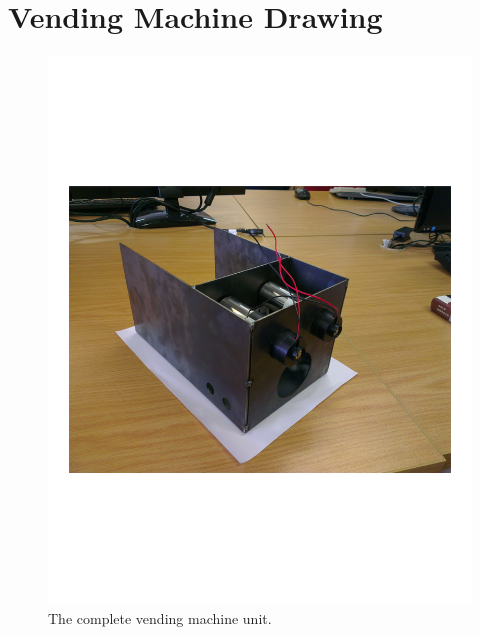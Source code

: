 \chapter{Vending Machine Drawing}
\label{app:vm-tekeninge}

\begin{figure}
 \centering 
 \includegraphics[clip=true, trim = 80 180 150 200,
 scale=0.7]{complete_vm}
 \caption{The complete vending machine unit.}
 \label{fig:vm-actual}
\end{figure}